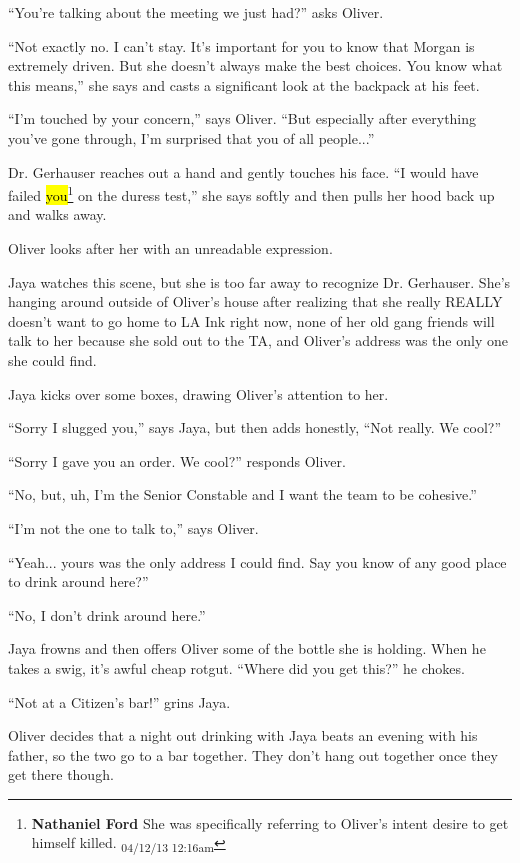 ``You're talking about the meeting we just had?'' asks Oliver.

``Not exactly no.  I can't stay.  It's important for you to know that Morgan is extremely driven.  But she doesn't always make the best choices.  You know what this means,'' she says and casts a significant look at the backpack at his feet.

``I'm touched by your concern,'' says Oliver.  ``But especially after everything you've gone through, I'm surprised that you of all people...''

Dr. Gerhauser reaches out a hand and gently touches his face.  ``I would have failed \hl{you}\footnote{\textbf{Nathaniel Ford }She was specifically referring to Oliver's intent desire to get himself killed. \textsubscript{04/12/13 12:16am}} on the duress test,'' she says softly and then pulls her hood back up and walks away.

Oliver looks after her with an unreadable expression.



Jaya watches this scene, but she is too far away to recognize Dr. Gerhauser.  She's hanging around outside of Oliver's house after realizing that she really REALLY doesn't want to go home to LA Ink right now, none of her old gang friends will talk to her because she sold out to the TA, and Oliver's address was the only one she could find.



Jaya kicks over some boxes, drawing Oliver's attention to her.

``Sorry I slugged you,'' says Jaya, but then adds honestly, ``Not really.  We cool?''

``Sorry I gave you an order.  We cool?'' responds Oliver.

``No, but, uh, I'm the Senior Constable and I want the team to be cohesive.''

``I'm not the one to talk to,'' says Oliver.

``Yeah... yours was the only address I could find.  Say you know of any good place to drink around here?''

``No, I don't drink around here.''

Jaya frowns and then offers Oliver some of the bottle she is holding.  When he takes a swig, it's awful cheap rotgut.  ``Where did you get this?'' he chokes.

``Not at a Citizen's bar!'' grins Jaya.

Oliver decides that a night out drinking with Jaya beats an evening with his father, so the two go to a bar together.  They don't hang out together once they get there though.


